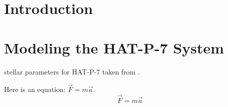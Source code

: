 \documentclass[manuscript]{aastex}
\begin{document}






\section{Introduction}


\section{Modeling the HAT-P-7 System}

stellar parameters for HAT-P-7 taken from \citet{2012ApJ...757..161T}.

Here is an equation: $\vec{F} = m \vec{a}$.
\begin{equation}
\vec{F} = m \vec{a}
\end{equation}
\end{document}
